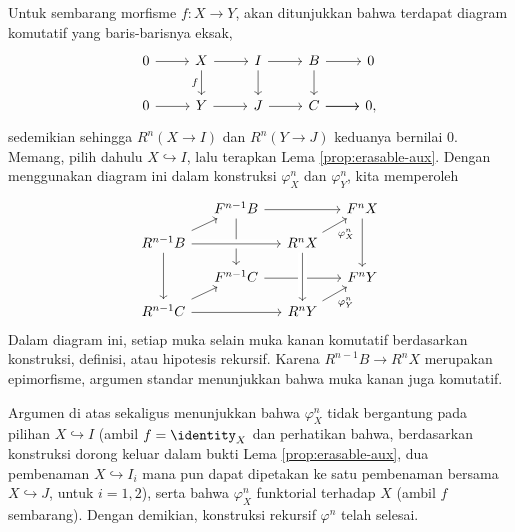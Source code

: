 \begin{bukti}
	Untuk sembarang morfisme $f: X \to Y$, akan ditunjukkan bahwa terdapat diagram komutatif yang baris-barisnya eksak,
	\begin{equation}\label{eqn:erasable-univ-delta}\begin{tikzcd}
		0 \arrow[r] & X \arrow[d, "f"'] \arrow[r] & I \arrow[r] \arrow[d] & B \arrow[d] \arrow[r] & 0 \\
		0 \arrow[r] & Y \arrow[r] & J \arrow[r] & \arrow[r] C \arrow[r] & 0 ,
	\end{tikzcd}\end{equation}
	sedemikian sehingga $R^n(X \to I)$ dan $R^n(Y \to J)$ keduanya bernilai $0$. Memang, pilih dahulu $X \hookrightarrow I$, lalu terapkan Lema \ref{prop:erasable-aux}. Dengan menggunakan diagram ini dalam konstruksi $\varphi^n_X$ dan $\varphi^n_Y$, kita memperoleh
	\[\begin{tikzcd}[row sep=small, column sep=small]
		& F^{n-1} B \arrow[rr] \arrow[dd] & & F^n X \arrow[dd] \\
		R^{n-1} B \arrow[ru] \arrow[rr, crossing over] \arrow[dd] & & R^n X \arrow[ru, "{\varphi_X^n}"'] & \\
		& F^{n-1} C \arrow[rr] & & F^n Y \\
		R^{n-1} C \arrow[ru] \arrow[rr] & & R^n Y \arrow[ru, "{\varphi_Y^n}"'] \arrow[leftarrow, uu, crossing over] &
	\end{tikzcd}\]
	Dalam diagram ini, setiap muka selain muka kanan komutatif berdasarkan konstruksi, definisi, atau hipotesis rekursif. Karena $R^{n-1} B \to R^n X$ merupakan epimorfisme, argumen standar menunjukkan bahwa muka kanan juga komutatif.
	
	Argumen di atas sekaligus menunjukkan bahwa $\varphi^n_X$ tidak bergantung pada pilihan $X \hookrightarrow I$ (ambil $f = \identity_X$ dan perhatikan bahwa, berdasarkan konstruksi dorong keluar dalam bukti Lema \ref{prop:erasable-aux}, dua pembenaman $X \hookrightarrow I_i$ mana pun dapat dipetakan ke satu pembenaman bersama $X \hookrightarrow J$, untuk $i=1,2$), serta bahwa $\varphi^n_X$ funktorial terhadap $X$ (ambil $f$ sembarang). Dengan demikian, konstruksi rekursif $\varphi^n$ telah selesai.
	

\end{bukti}
